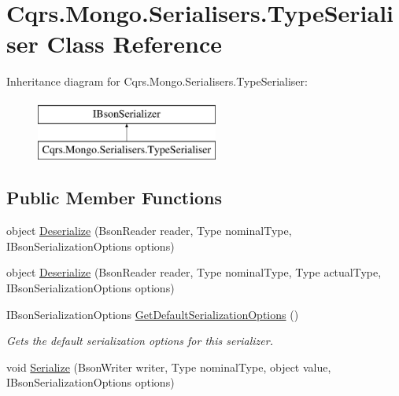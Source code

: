 \hypertarget{classCqrs_1_1Mongo_1_1Serialisers_1_1TypeSerialiser}{}\section{Cqrs.\+Mongo.\+Serialisers.\+Type\+Serialiser Class Reference}
\label{classCqrs_1_1Mongo_1_1Serialisers_1_1TypeSerialiser}
Inheritance diagram for Cqrs.\+Mongo.\+Serialisers.\+Type\+Serialiser\+:\begin{figure}[H]
\begin{center}
\leavevmode
\includegraphics[height=2.000000cm]{classCqrs_1_1Mongo_1_1Serialisers_1_1TypeSerialiser}
\end{center}
\end{figure}
\subsection*{Public Member Functions}
\begin{DoxyCompactItemize}
\item 
object \hyperlink{classCqrs_1_1Mongo_1_1Serialisers_1_1TypeSerialiser_a38d61038bc9aab09572c9c05e8b9460b}{Deserialize} (Bson\+Reader reader, Type nominal\+Type, I\+Bson\+Serialization\+Options options)
\item 
object \hyperlink{classCqrs_1_1Mongo_1_1Serialisers_1_1TypeSerialiser_aca73371a2a3ddd291d023584cb676ed3}{Deserialize} (Bson\+Reader reader, Type nominal\+Type, Type actual\+Type, I\+Bson\+Serialization\+Options options)
\item 
I\+Bson\+Serialization\+Options \hyperlink{classCqrs_1_1Mongo_1_1Serialisers_1_1TypeSerialiser_af0e31e1a524812836d0b73dca29b1332}{Get\+Default\+Serialization\+Options} ()
\begin{DoxyCompactList}\small\item\em Gets the default serialization options for this serializer. \end{DoxyCompactList}\item 
void \hyperlink{classCqrs_1_1Mongo_1_1Serialisers_1_1TypeSerialiser_aed86906daa5c18a29fd06fb3d9d3fd13}{Serialize} (Bson\+Writer writer, Type nominal\+Type, object value, I\+Bson\+Serialization\+Options options)
\end{DoxyCompactItemize}


